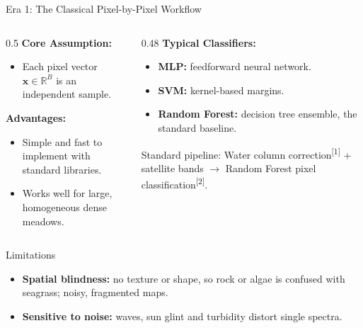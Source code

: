 \documentclass[aspectratio=169,10pt]{beamer}
\begin{document}
\begin{frame}{Era 1: The Classical Pixel-by-Pixel Workflow}
  \begin{columns}[T]
    \begin{column}{0.5\textwidth}
      \textbf{Core Assumption:}
      \begin{itemize}\setlength{\itemsep}{1pt}\small
        \item Each pixel vector $\mathbf{x} \in \mathbb{R}^B$ is an independent sample.
      \end{itemize}
      \vspace{0.1cm}
      \textbf{Advantages:}
      \begin{itemize}\setlength{\itemsep}{1pt}\small
        \item Simple and fast to implement with standard libraries.
        \item Works well for large, homogeneous dense meadows.
      \end{itemize}
    \end{column}
    \begin{column}{0.48\textwidth}
      \textbf{Typical Classifiers:}
      \begin{itemize}\setlength{\itemsep}{1pt}\small
        \item \textbf{MLP:} feedforward neural network.
        \item \textbf{SVM:} kernel-based margins.
        \item \textbf{Random Forest:} decision tree ensemble, the standard baseline.
      \end{itemize}
      \vspace{0.08cm}
      \small Standard pipeline: Water column correction\textsuperscript{\color{OceanTeal}[1]} + satellite bands $\rightarrow$ Random Forest pixel classification\textsuperscript{\color{OceanTeal}[2]}.
    \end{column}
  \end{columns}

  \vspace{0.15cm}
  \begin{alertblock}{Limitations}
    \begin{itemize}\setlength{\itemsep}{1pt}\small
      \item \textbf{Spatial blindness:} no texture or shape, so rock or algae is confused with seagrass; noisy, fragmented maps.
      \item \textbf{Sensitive to noise:} waves, sun glint and turbidity distort single spectra.
    \end{itemize}
  \end{alertblock}


\end{frame}
\end{document}
